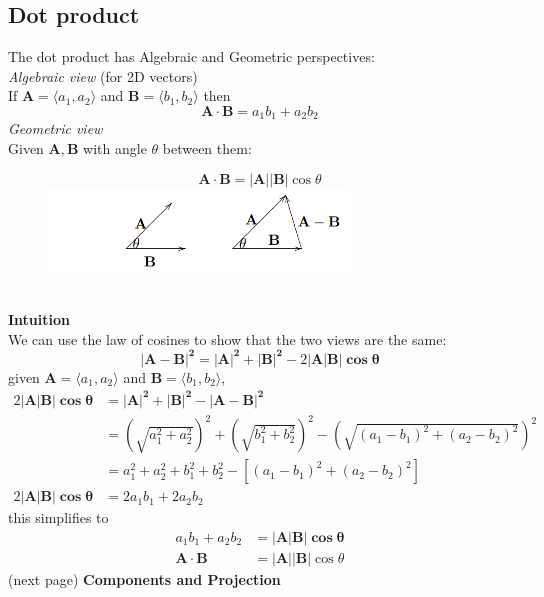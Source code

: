\documentclass{report}
\begin{document}
\subsection{Dot product} %
The dot product has Algebraic and Geometric perspectives:\\
\textit{Algebraic view} (for 2D vectors)\\
If $\mathbf{A}=\langle a_1,a_2\rangle$ and $\mathbf{B}=\langle b_1,b_2\rangle$ then
\begin{equation*}
\mathbf{A\cdot B}=a_1b_1+a_2b_2
\end{equation*}
\textit{Geometric view}\\
Given $\mathbf{A,B}$ with angle $\theta$ between them:
\begin{figure}[h]
\begin{equation*}
\mathbf{A\cdot B}=\mathbf{|A||B|}\cos\theta
\end{equation*}
\includegraphics[width=8cm]{Capture68}\\
\centering
\end{figure}\\
\textbf{Intuition}\\
We can use the law of cosines to show that the two views are the same:
\begin{equation*}
\mathbf{|A-B|^2=|A|^2+|B|^2}-2\mathbf{|A|B|\cos\theta}
\end{equation*}
given $\mathbf{A}=\langle a_1,a_2\rangle$ and $\mathbf{B}=\langle b_1,b_2\rangle$,
\begin{align*}
2\mathbf{|A|B|\cos\theta}&=\mathbf{|A|^2+|B|^2-|A-B|^2}\\
&=\left(\sqrt{a_1^2+a_2^2}\right)^2+\left(\sqrt{b_1^2+b_2^2}\right)^2-
\left(\sqrt{(a_1-b_1)^2+(a_2-b_2)^2}\right)^2\\
&=a_1^2+a_2^2+b_1^2+b_2^2-[(a_1-b_1)^2+(a_2-b_2)^2]\\
2\mathbf{|A|B|\cos\theta}&=2a_1b_1+2a_2b_2
\end{align*}
this simplifies to
\begin{align*}
a_1b_1+a_2b_2&=\mathbf{|A|B|\cos\theta}\\
\mathbf{A\cdot B}&=\mathbf{|A||B|}\cos\theta
\end{align*}
(next page)
\newpage
\noindent\textbf{Components and Projection}\\
\end{document}

